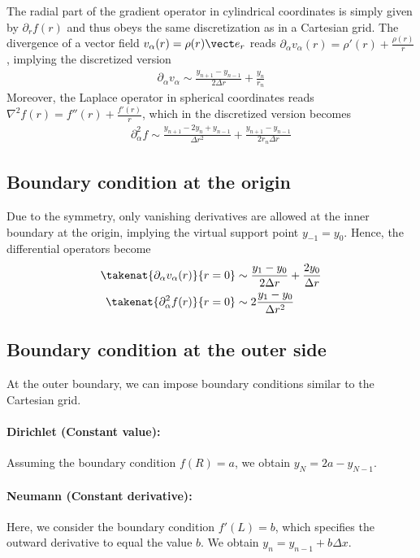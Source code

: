 \documentclass[
	superscriptaddress,
	twocolumn,
	aps, prl
]{revtex4-1}
\newcommand{\dx}{\Delta x}
\newcommand{\dr}{\Delta r}
\begin{document}
The radial part of the gradient operator in cylindrical coordinates is simply given by $\partial_r f(r)$ and thus obeys the same discretization as in a Cartesian grid.
The divergence of a vector field $v_\alpha(r) = \rho(r) \vect e_r$ reads
$\partial_\alpha v_\alpha(r) =  \rho'(r) + \frac{\rho(r)}{r}$, implying the discretized version
\begin{align}
	\partial_\alpha v_\alpha \sim
		\frac{y_{n+1} - y_{n-1}}{2\dr}
		+ \frac{y_n}{r_n}
\end{align}
Moreover, the Laplace operator in spherical coordinates reads $\nabla^2 f(r) = f''(r) + \frac{f'(r)}{r}$, which in the discretized version becomes
\begin{align}
	\partial_\alpha^2 f \sim
		\frac{y_{n+1} - 2 y_n + y_{n-1}}{\dr^2}
		+ \frac{y_{n+1} - y_{n-1}}{2 r_n \dr}
\end{align}

\subsection{Boundary condition at the origin}
Due to the symmetry, only vanishing derivatives are allowed at the inner boundary at the origin, implying the virtual support point $y_{-1} = y_0$.
Hence, the differential operators become
\begin{subequations}
\begin{align}
	\takenat{\partial_\alpha v_\alpha(r)}{r=0} &\sim
		\frac{y_1 - y_0}{2\dr}
		+ \frac{2y_0}{\dr}
\\
	\takenat{\partial_\alpha^2 f(r)}{r=0} &\sim
		2\frac{y_1 - y_0}{\dr^2}
\end{align}
\end{subequations}


\subsection{Boundary condition at the outer side}
At the outer boundary, we can impose boundary conditions similar to the Cartesian grid.

\paragraph{Dirichlet (Constant value):}
Assuming the boundary condition $f(R) = a$, we obtain $y_N = 2a - y_{N-1}$.

\paragraph{Neumann (Constant derivative):}
Here, we consider the boundary condition $f'(L) = b$, which specifies the outward derivative to equal the value $b$.
We obtain $y_n = y_{n-1} + b \dx$.
\end{document}
